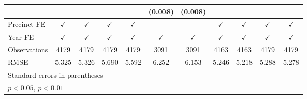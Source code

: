 \begin{sidewaystable}[htbp]
\begin{tabular}{l*{10}{c}}
                    &                    &                    &                    &                    &     (0.008)        &     (0.008)        &                    &                    &                    &                    \\
[1em]
\hline Precinct FE  &$\checkmark$        &$\checkmark$        &$\checkmark$        &$\checkmark$        &                    &                    &$\checkmark$        &$\checkmark$        &$\checkmark$        &$\checkmark$        \\
[1em]
Year FE             &$\checkmark$        &$\checkmark$        &$\checkmark$        &$\checkmark$        &$\checkmark$        &$\checkmark$        &$\checkmark$        &$\checkmark$        &$\checkmark$        &$\checkmark$        \\
\hline
Observations        &        4179        &        4179        &        4179        &        4179        &        3091        &        3091        &        4163        &        4163        &        4179        &        4179        \\
RMSE                &       5.325        &       5.326        &       5.690        &       5.592        &       6.252        &       6.153        &       5.246        &       5.218        &       5.288        &       5.278        \\
\hline\hline
\multicolumn{11}{l}{\footnotesize Standard errors in parentheses}\\
\multicolumn{11}{l}{\footnotesize \sym{*} \(p<0.05\), \sym{**} \(p<0.01\)}\\
\end{tabular}
\end{sidewaystable}
